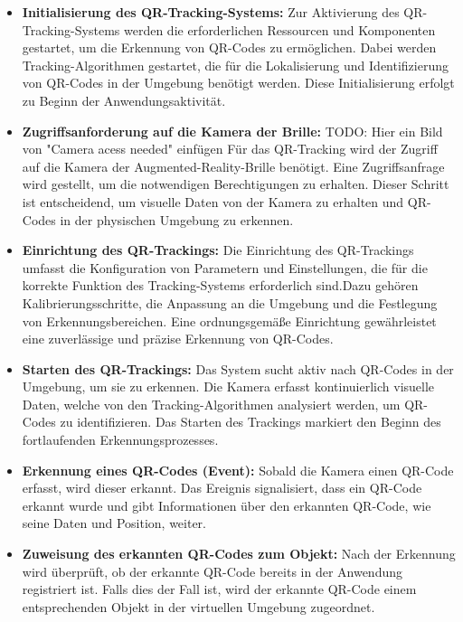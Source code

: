 \begin{itemize}

\item \textbf{Initialisierung des QR-Tracking-Systems:}
Zur Aktivierung des QR-Tracking-Systems werden die erforderlichen Ressourcen und Komponenten gestartet, um die Erkennung
von QR-Codes zu ermöglichen. Dabei werden Tracking-Algorithmen gestartet, die für die Lokalisierung und Identifizierung
von QR-Codes in der Umgebung benötigt werden. Diese Initialisierung erfolgt zu Beginn der Anwendungsaktivität.

\item \textbf{Zugriffsanforderung auf die Kamera der Brille:}
TODO: Hier ein Bild von "Camera acess needed" einfügen
Für das QR-Tracking wird der Zugriff auf die Kamera der Augmented-Reality-Brille benötigt. Eine Zugriffsanfrage wird
gestellt, um die notwendigen Berechtigungen zu erhalten. Dieser Schritt ist entscheidend, um visuelle Daten von der Kamera
zu erhalten und QR-Codes in der physischen Umgebung zu erkennen.

\item \textbf{Einrichtung des QR-Trackings:}
Die Einrichtung des QR-Trackings umfasst die Konfiguration von Parametern und Einstellungen, die für die korrekte
Funktion des Tracking-Systems erforderlich sind.Dazu gehören Kalibrierungsschritte, die Anpassung an die Umgebung und die
Festlegung von Erkennungsbereichen. Eine ordnungsgemäße Einrichtung gewährleistet eine zuverlässige und präzise Erkennung von QR-Codes.

\item \textbf{Starten des QR-Trackings:}
Das System sucht aktiv nach QR-Codes in der Umgebung, um sie zu erkennen. Die Kamera erfasst kontinuierlich visuelle
Daten, welche von den Tracking-Algorithmen analysiert werden, um QR-Codes zu identifizieren. Das Starten des Trackings
markiert den Beginn des fortlaufenden Erkennungsprozesses.

\item \textbf{Erkennung eines QR-Codes (Event):}
Sobald die Kamera einen QR-Code erfasst, wird dieser erkannt. Das Ereignis signalisiert, dass ein QR-Code erkannt wurde
und gibt Informationen über den erkannten QR-Code, wie seine Daten und Position, weiter.

\item \textbf{Zuweisung des erkannten QR-Codes zum Objekt:}
Nach der Erkennung wird überprüft, ob der erkannte QR-Code bereits in der Anwendung registriert ist. Falls dies der Fall
ist, wird der erkannte QR-Code einem entsprechenden Objekt in der virtuellen Umgebung zugeordnet.


\end{itemize}
